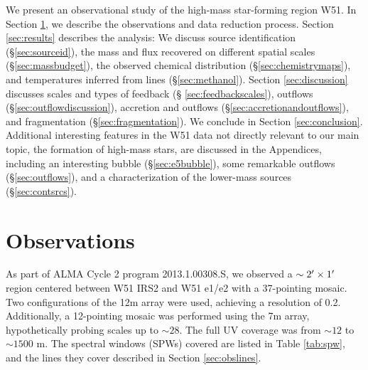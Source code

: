 \documentclass{emulateapj}
\begin{document}
 We present an
observational study of the high-mass star-forming region W51.  In Section
\ref{sec:observations}, we describe the observations and data reduction
process.  Section \ref{sec:results} describes the analysis:
We discuss source identification (\S \ref{sec:sourceid}),
the mass and flux recovered on different
spatial scales (\S \ref{sec:massbudget}),
the observed chemical distribution (\S \ref{sec:chemistrymaps}), and
temperatures inferred from \methanol lines (\S \ref{sec:methanol}).
Section \ref{sec:discussion} discusses scales and types of feedback (\S
\ref{sec:feedbackscales}), outflows (\S \ref{sec:outflowdiscussion}),
accretion and outflows (\S \ref{sec:accretionandoutflows}),
and fragmentation (\S \ref{sec:fragmentation}).  
We conclude in Section \ref{sec:conclusion}.
Additional interesting features in the W51 data not directly relevant
to our main topic, the formation of high-mass stars,
are discussed in the Appendices, including
an interesting bubble (\S \ref{sec:e5bubble}), some remarkable outflows 
(\S \ref{sec:outflows}), and a characterization of the lower-mass sources
(\S \ref{sec:contsrcs}).






\section{Observations}
\label{sec:observations}
As part of ALMA Cycle 2 program 2013.1.00308.S, we observed a
$\sim2\mbox{$^\prime$}\times1\mbox{$^\prime$}$ region centered between W51 IRS2 and W51 e1/e2
with a 37-pointing mosaic.  Two configurations of the 12m array were used,
achieving a resolution of 0.2\arcsec.  Additionally, a 12-pointing mosaic was
performed using the 7m array, hypothetically probing scales up to
$\sim28$\arcsec.  The full UV coverage was from $\sim12$ to $\sim1500$ m.
The spectral windows (SPWs) covered are listed in Table \ref{tab:spw},
and the lines they cover described in Section \ref{sec:obslines}.
\end{document}
